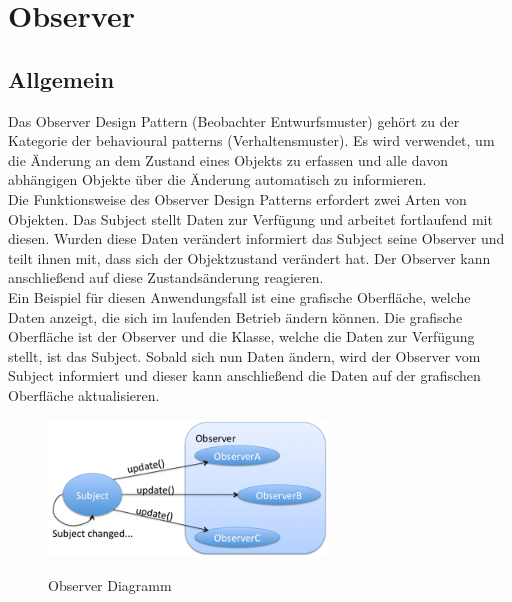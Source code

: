 
\chapter{Observer}

\section{Allgemein}
Das Observer Design Pattern (Beobachter Entwurfsmuster) gehört zu der Kategorie der behavioural 
patterns (Verhaltensmuster). Es wird verwendet, um die Änderung an dem Zustand eines Objekts zu
erfassen und alle davon abhängigen Objekte über die Änderung automatisch zu
informieren.\\
\newline
Die Funktionsweise des Observer Design Patterns erfordert zwei Arten von Objekten. Das Subject 
stellt Daten zur Verfügung und arbeitet fortlaufend mit diesen. Wurden diese Daten verändert
informiert das Subject seine Observer und teilt ihnen mit, dass sich der Objektzustand verändert 
hat. Der Observer kann anschließend auf diese Zustandsänderung reagieren.\\
\newline
Ein Beispiel für diesen Anwendungsfall ist eine grafische Oberfläche, welche
Daten anzeigt, die sich im laufenden Betrieb ändern können. Die grafische Oberfläche ist der Observer und die 
Klasse, welche die Daten zur Verfügung stellt, ist das Subject. Sobald sich nun
Daten ändern, wird der Observer vom Subject informiert und dieser kann anschließend die Daten auf der 
grafischen Oberfläche aktualisieren.\\
\newline

\begin{figure}[!htbp]
	\centering
	\includegraphics[width=0.66\textwidth]{content/pictures/Observer/observer01.png}
	\label{pic:bild}
	\caption{Observer Diagramm \cite{paulObserver}}
\end{figure}

